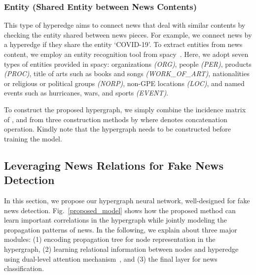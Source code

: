 \documentclass[conference]{IEEEtran}
\begin{document}
\subsubsection{\textbf{Entity} (Shared Entity between News Contents)} This type of hyperedge aims to connect news that deal with similar contents by checking the entity shared between news pieces. For example, we connect news by a hyperedge if they share the entity `COVID-19'. To extract entities from news content, we employ an entity recognition tool from spacy~\cite{honnibal2017spacy}. Here, we adopt seven types of entities provided in spacy: organizations \textit{(ORG)}, people \textit{(PER)}, products \textit{(PROC)}, title of arts such as books and songs \textit{(WORK\_OF\_ART)}, nationalities or religious or political groups \textit{(NORP)}, non-GPE locations \textit{(LOC)}, and named events such as hurricanes, wars, and sports \textit{(EVENT)}.

\hfill

To construct the proposed hypergraph, we simply combine the incidence matrix of , and  from three construction methods by  where  denotes concatenation operation. Kindly note that the hypergraph needs to be constructed before training the model.


\subsection{Leveraging News Relations for Fake News Detection}
\label{hypergraph attention network}
In this section, we propose our hypergraph neural network, well-designed for fake news detection. Fig.~\ref{proposed_model} shows how the proposed method can learn important correlations in the hypergraph while jointly modeling the propagation patterns of news. In the following, we explain about three major modules: (1) encoding  propagation tree for node representation in the hypergraph, (2) learning relational information between nodes and hyperedge using dual-level attention mechanism~\cite{ding2020more}, and (3) the final layer for news classification.
\end{document}
